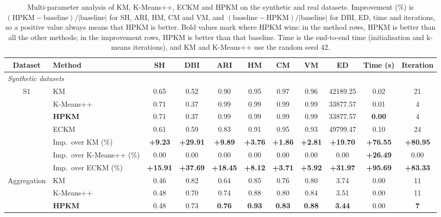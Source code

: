 \begin{table}[p]
\color{blue}
\centering
\caption{Multi-parameter analysis of KM, K-Means++, ECKM and HPKM on the synthetic and real datasets. Improvement (\%) is $(\mathrm{HPKM}-\mathrm{baseline})/|\mathrm{baseline}|$ for SH, ARI, HM, CM and VM, and $(\mathrm{baseline}-\mathrm{HPKM})/|\mathrm{baseline}|$ for DBI, ED, time and iterations, so a positive value always means that HPKM is better. Bold values mark where HPKM wins: in the method rows, HPKM is better than all the other methods; in the improvement rows, HPKM is better than that baseline. Time is the end-to-end time (initialisation and k-means iterations), and KM and K-Means++ use the random seed 42.}
\label{tab:parameter_analysis}
\scriptsize
\setlength{\tabcolsep}{3pt}
\renewcommand{\arraystretch}{0.92}
\begin{adjustbox}{max width=\textwidth, max totalheight=0.86\textheight}
\begin{tabular}{|c|l|ccccccccc|}
\hline
Dataset & Method & SH & DBI & ARI & HM & CM & VM & ED & Time (s) & Iteration \\
\hline
\multicolumn{11}{|l|}{\textit{Synthetic datasets}} \\
\hline
S1 & KM & 0.65 & 0.52 & 0.90 & 0.95 & 0.97 & 0.96 & 42189.25 & 0.02 & 21 \\
 & K-Means++ & 0.71 & 0.37 & 0.99 & 0.99 & 0.99 & 0.99 & 33877.57 & 0.01 & 4 \\
 & \textbf{HPKM} & 0.71 & 0.37 & 0.99 & 0.99 & 0.99 & 0.99 & 33877.57 & \textbf{0.00} & 4 \\
 & ECKM & 0.61 & 0.59 & 0.83 & 0.91 & 0.95 & 0.93 & 49799.47 & 0.10 & 24 \\
& Imp.\ over KM (\%) & \textbf{+9.23} & \textbf{+29.91} & \textbf{+9.89} & \textbf{+3.76} & \textbf{+1.86} & \textbf{+2.81} & \textbf{+19.70} & \textbf{+76.55} & \textbf{+80.95} \\
& Imp.\ over K-Means++ (\%) & 0.00 & 0.00 & 0.00 & 0.00 & 0.00 & 0.00 & 0.00 & \textbf{+26.49} & 0.00 \\
& Imp.\ over ECKM (\%) & \textbf{+15.91} & \textbf{+37.69} & \textbf{+18.45} & \textbf{+8.12} & \textbf{+3.71} & \textbf{+5.92} & \textbf{+31.97} & \textbf{+95.69} & \textbf{+83.33} \\
\hline
Aggregation & KM & 0.46 & 0.82 & 0.64 & 0.85 & 0.76 & 0.80 & 3.74 & 0.00 & 11 \\
 & K-Means++ & 0.48 & 0.70 & 0.74 & 0.88 & 0.80 & 0.84 & 3.51 & 0.00 & 11 \\
 & \textbf{HPKM} & 0.48 & 0.73 & \textbf{0.76} & \textbf{0.93} & \textbf{0.83} & \textbf{0.88} & \textbf{3.44} & 0.00 & \textbf{7} \\

\end{tabular}
\end{adjustbox}
\end{table}
